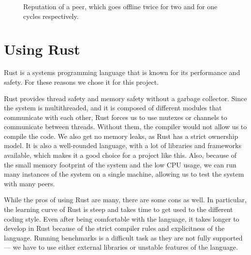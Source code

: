 \begin{figure}
  \centering
  \caption{Reputation of a peer, which goes offline twice for two and for one cycles respectively.}
  \label{fig:reputation_recovery}
\end{figure}

\section{Using Rust}

Rust is a systems programming language that is known for its performance and safety.
For these reasons we chose it for this project.

Rust provides thread safety and memory safety without a garbage collector.
Since the system is multithreaded, and it is composed of different modules
that communicate with each other, Rust forces us to use mutexes or channels
to communicate between threads.
Without them, the compiler would not allow us to compile the code.
We also get no memory leaks, as Rust has a strict ownership model.
It is also a well-rounded language, with a lot of libraries and frameworks available,
which makes it a good choice for a project like this.
Also, because of the small memory footprint of the system and the low CPU usage,
we can run many instances of the system on a single machine,
allowing us to test the system with many peers.

While the pros of using Rust are many, there are some cons as well.
In particular, the learning curve of Rust is steep and takes time to get used to
the different coding style.
Even after being comfortable with the language, it takes longer to develop in Rust
because of the strict compiler rules and explicitness of the language.
Running benchmarks is a difficult task as they are not fully supported ---
we have to use either external libraries or unstable features of the language.

